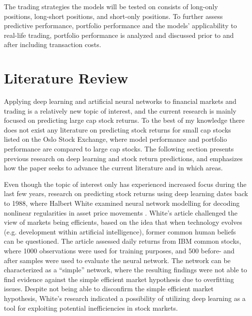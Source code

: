 \indent \newline
The trading strategies the models will be tested on consists of long-only positions, long-short positions, and short-only positions. To further assess predictive performance, portfolio performance and the models' applicability to real-life trading, portfolio performance is analyzed and discussed prior to and after including transaction costs. 

\section{Literature Review}
Applying deep learning and artificial neural networks to financial markets and trading is a relatively new topic of interest, and the current research is mainly focused on predicting large cap stock returns. To the best of my knowledge there does not exist any literature on predicting stock returns for small cap stocks listed on the Oslo Stock Exchange, where model performance and portfolio performance are compared to large cap stocks. The following section presents previous research on deep learning and stock return predictions, and emphasizes how the paper seeks to advance the current literature and in which areas.     

\indent\newline
Even though the topic of interest only has experienced increased focus during the last few years, research on predicting stock returns using deep learning dates back to 1988, where Halbert White examined neural network modelling for decoding nonlinear regularities in asset price movements \cite{white}. White’s article challenged the view of markets being efficients, based on the idea that when technology evolves (e.g. development within artificial intelligence), former common human beliefs can be questioned. The article assessed daily returns from IBM common stocks, where 1000 observations were used for training purposes, and 500 before- and after samples were used to evaluate the neural network. The network can be characterized as a “simple” network, where the resulting findings were not able to find evidence against the simple efficient market hypothesis due to overfitting issues. Despite not being able to disconfirm the simple efficient market hypothesis, White’s research indicated a possibility of utilizing deep learning as a tool for exploiting potential inefficiencies in stock markets.  

